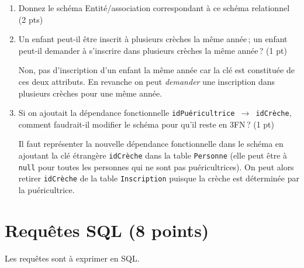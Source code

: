 \begin{enumerate}
  \item Donnez le schéma Entité/association correspondant à ce schéma relationnel (2 pts)
  
  \item Un enfant peut-il être inscrit à plusieurs crèches la même année\,; un enfant peut-il demander
      à s'inscrire dans plusieurs crèches la même année\,? (1 pt)
      
\begin{solution}
    Non, pas d'inscription d'un enfant la même année car la clé est constituée 
    de ces deux attributs. En revanche on peut \emph{demander} une inscription
    dans plusieurs crèches pour une même année.
\end{solution}


    \item Si on ajoutait la dépendance fonctionnelle \texttt{idPuéricultrice $\to$ idCrèche},
        comment faudrait-il modifier le schéma pour qu'il reste en 3FN\,? (1 pt)
      
       
\begin{solution}
Il faut 
    représenter la nouvelle dépendance fonctionnelle dans le schéma
    en ajoutant la clé étrangère \texttt{idCrèche} dans la table
    \texttt{Personne} (elle peut être à \texttt{null} pour toutes les 
    personnes qui ne sont pas puéricultrices). 
    On peut alors retirer \texttt{idCrèche} de la table \texttt{Inscription} puisque
    la crèche est déterminée par la puéricultrice. 
\end{solution}
 
  
\end{enumerate}

\section{Requêtes SQL (8 points)}

Les requêtes sont à exprimer en SQL. 


